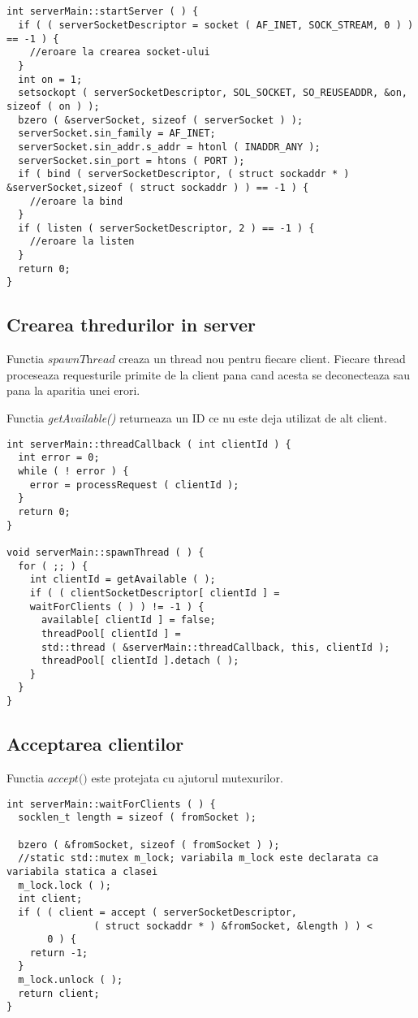 \documentclass[runningheads]{llncs}
\begin{document}
\begin{lstlisting}


int serverMain::startServer ( ) {
  if ( ( serverSocketDescriptor = socket ( AF_INET, SOCK_STREAM, 0 ) ) == -1 ) {
    //eroare la crearea socket-ului
  }
  int on = 1;
  setsockopt ( serverSocketDescriptor, SOL_SOCKET, SO_REUSEADDR, &on, sizeof ( on ) );
  bzero ( &serverSocket, sizeof ( serverSocket ) );
  serverSocket.sin_family = AF_INET;
  serverSocket.sin_addr.s_addr = htonl ( INADDR_ANY );
  serverSocket.sin_port = htons ( PORT );
  if ( bind ( serverSocketDescriptor, ( struct sockaddr * ) &serverSocket,sizeof ( struct sockaddr ) ) == -1 ) {
    //eroare la bind
  }
  if ( listen ( serverSocketDescriptor, 2 ) == -1 ) {
    //eroare la listen
  }
  return 0;
}
\end{lstlisting}

\subsection{Crearea thredurilor in server}

Functia $\textit{spawnThread}$ creaza un thread nou pentru fiecare client. Fiecare thread proceseaza requesturile primite de la client pana cand acesta se deconecteaza sau pana la aparitia unei erori.

Functia \textit{ getAvailable() } returneaza un ID ce nu este deja utilizat de alt client. 

\begin{lstlisting}
int serverMain::threadCallback ( int clientId ) {
  int error = 0;
  while ( ! error ) {
    error = processRequest ( clientId );
  }
  return 0;
}

void serverMain::spawnThread ( ) {
  for ( ;; ) {
    int clientId = getAvailable ( );
    if ( ( clientSocketDescriptor[ clientId ] = 
    waitForClients ( ) ) != -1 ) {
      available[ clientId ] = false;
      threadPool[ clientId ] =
      std::thread ( &serverMain::threadCallback, this, clientId );
      threadPool[ clientId ].detach ( );
    }
  }
}
\end{lstlisting}

\subsection{Acceptarea clientilor}

Functia $\textit{accept()}$ este protejata cu ajutorul mutexurilor. 

\begin{lstlisting}
int serverMain::waitForClients ( ) {
  socklen_t length = sizeof ( fromSocket );

  bzero ( &fromSocket, sizeof ( fromSocket ) );
  //static std::mutex m_lock; variabila m_lock este declarata ca variabila statica a clasei
  m_lock.lock ( );
  int client;
  if ( ( client = accept ( serverSocketDescriptor,
               ( struct sockaddr * ) &fromSocket, &length ) ) <
       0 ) {
    return -1;
  }
  m_lock.unlock ( );
  return client;
}

\end{lstlisting}
\end{document}
